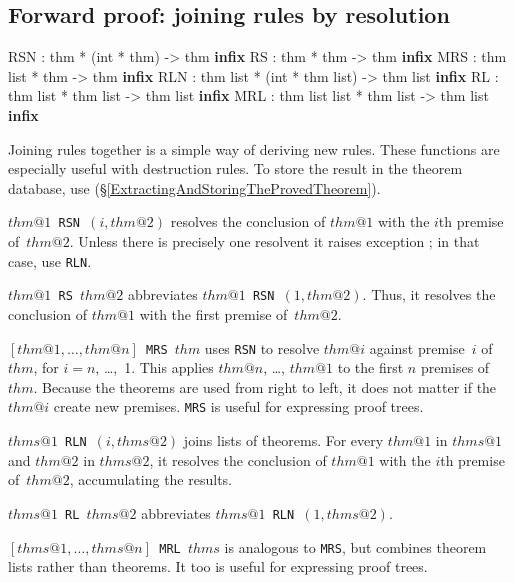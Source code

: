 \subsection{Forward proof: joining rules by resolution}
\begin{ttbox} 
RSN : thm * (int * thm) -> thm                 \hfill{\bf infix}
RS  : thm * thm -> thm                         \hfill{\bf infix}
MRS : thm list * thm -> thm                    \hfill{\bf infix}
RLN : thm list * (int * thm list) -> thm list  \hfill{\bf infix}
RL  : thm list * thm list -> thm list          \hfill{\bf infix}
MRL : thm list list * thm list -> thm list     \hfill{\bf infix}
\end{ttbox}
Joining rules together is a simple way of deriving new rules.  These
functions are especially useful with destruction rules.  To store
the result in the theorem database, use 
(\S\ref{ExtractingAndStoringTheProvedTheorem}). 
\begin{ttdescription}
\item[\tt$thm@1$ RSN $(i,thm@2)$]  
  resolves the conclusion of $thm@1$ with the $i$th premise of~$thm@2$.
  Unless there is precisely one resolvent it raises exception
  ; in that case, use {\tt RLN}.

\item[\tt$thm@1$ RS $thm@2$]  
abbreviates \hbox{\tt$thm@1$ RSN $(1,thm@2)$}.  Thus, it resolves the
conclusion of $thm@1$ with the first premise of~$thm@2$.

\item[\tt {$[thm@1,\ldots,thm@n]$} MRS $thm$]  
  uses {\tt RSN} to resolve $thm@i$ against premise~$i$ of $thm$, for
  $i=n$, \ldots,~1.  This applies $thm@n$, \ldots, $thm@1$ to the first $n$
  premises of $thm$.  Because the theorems are used from right to left, it
  does not matter if the $thm@i$ create new premises.  {\tt MRS} is useful
  for expressing proof trees.

\item[\tt$thms@1$ RLN $(i,thms@2)$]  
  joins lists of theorems.  For every $thm@1$ in $thms@1$ and $thm@2$ in
  $thms@2$, it resolves the conclusion of $thm@1$ with the $i$th premise
  of~$thm@2$, accumulating the results. 

\item[\tt$thms@1$ RL $thms@2$]  
abbreviates \hbox{\tt$thms@1$ RLN $(1,thms@2)$}. 

\item[\tt {$[thms@1,\ldots,thms@n]$} MRL $thms$]  
is analogous to {\tt MRS}, but combines theorem lists rather than theorems.
It too is useful for expressing proof trees.
\end{ttdescription}


